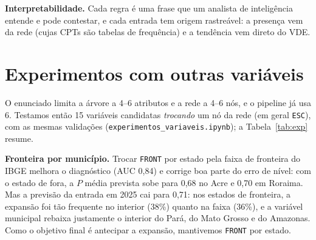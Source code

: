 \documentclass[10pt,a4paper,twocolumn]{article}
\begin{document}
\textbf{Interpretabilidade.} Cada regra é uma frase que um analista de inteligência entende e pode
contestar, e cada entrada tem origem rastreável: a presença vem da rede (cujas CPTs são tabelas de
frequência) e a tendência vem direto do VDE.

\section{Experimentos com outras variáveis}\label{sec:exp}
O enunciado limita a árvore a 4--6 atributos e a rede a 4--6 nós, e o pipeline já usa 6. Testamos
então 15 variáveis candidatas \emph{trocando} um nó da rede (em geral \texttt{ESC}), com as mesmas
validações (\texttt{experimentos\_variaveis.ipynb}); a Tabela~\ref{tab:exp} resume.

\begin{table}[H]\centering\footnotesize\setlength\tabcolsep{3pt}
\caption{AUC da rede com cada variável candidata (probabilidades fora da dobra).}\label{tab:exp}\end{table}

\textbf{Fronteira por município.} Trocar \texttt{FRONT} por estado pela faixa de fronteira do IBGE
melhora o diagnóstico (AUC 0,84) e corrige boa parte do erro de nível: com o estado de fora, a
$P$ média prevista sobe para 0,68 no Acre e 0,70 em Roraima. Mas a previsão da entrada em 2025 cai
para 0,71: nos estados de fronteira, a expansão foi tão frequente no interior (38\%) quanto na faixa
(36\%), e a variável municipal rebaixa justamente o interior do Pará, do Mato Grosso e do Amazonas.
Como o objetivo final é antecipar a expansão, mantivemos \texttt{FRONT} por estado.
\end{document}

